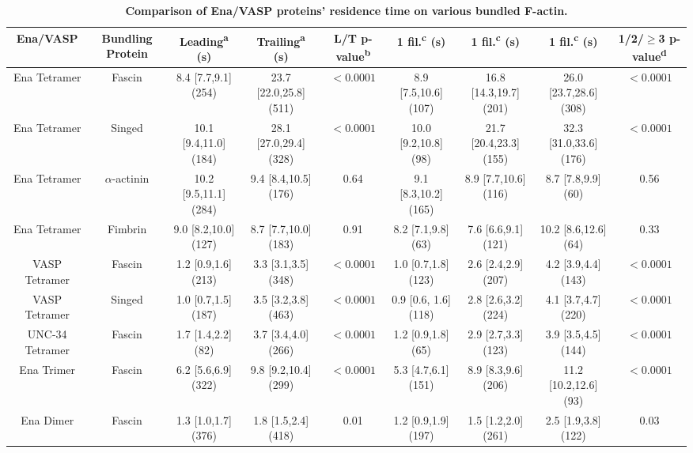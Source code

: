 \begin{table}[hbtp]
\footnotesize
\centering 
\begin{tabulary}{1.0\textwidth}{C C C C C C C C C}
\toprule Ena\slash VASP & Bundling Protein & Leading\textsuperscript{a} (s) & Trailing\textsuperscript{a} (s) & L/T p-value\textsuperscript{b} & 1 fil.\textsuperscript{c} (s) &  1 fil.\textsuperscript{c} (s) & 1 fil.\textsuperscript{c} (s) & 1/2/$\geq$3 p-value\textsuperscript{d} \\ \midrule 
Ena Tetramer & Fascin & 8.4 [7.7,9.1] (254) & 23.7 [22.0,25.8] (511) & ${<0.0001}$ & 8.9 [7.5,10.6] (107) & 16.8 [14.3,19.7] (201) & 26.0 [23.7,28.6] (308) & ${<0.0001}$ \\ 
Ena Tetramer & Singed & 10.1 [9.4,11.0] (184) & 28.1 [27.0,29.4] (328) & ${<0.0001}$ & 10.0 [9.2,10.8] (98) & 21.7 [20.4,23.3] (155) & 32.3 [31.0,33.6] (176) & ${<0.0001}$ \\ 
Ena Tetramer & $\alpha$-actinin & 10.2 [9.5,11.1] (284) & 9.4 [8.4,10.5] (176) & 0.64 & 9.1 [8.3,10.2] (165) & 8.9 [7.7,10.6] (116) & 8.7 [7.8,9.9] (60) & 0.56 \\
Ena Tetramer & Fimbrin & 9.0 [8.2,10.0] (127) & 8.7 [7.7,10.0] (183) & 0.91 & 8.2 [7.1,9.8] (63) & 7.6 [6.6,9.1] (121) & 10.2 [8.6,12.6] (64) & 0.33 \\
VASP Tetramer & Fascin & 1.2 [0.9,1.6] (213) & 3.3 [3.1,3.5] (348) & ${<0.0001}$ & 1.0 [0.7,1.8] (123) & 2.6 [2.4,2.9] (207) & 4.2 [3.9,4.4] (143) & ${<0.0001}$ \\
VASP Tetramer & Singed & 1.0 [0.7,1.5] (187) & 3.5 [3.2,3.8] (463) & ${<0.0001}$ & 0.9  [0.6, 1.6] (118) & 2.8 [2.6,3.2] (224) & 4.1 [3.7,4.7] (220) & ${<0.0001}$ \\
UNC-34 Tetramer & Fascin & 1.7 [1.4,2.2] (82) & 3.7 [3.4,4.0] (266) & ${<0.0001}$ & 1.2 [0.9,1.8] (65) & 2.9 [2.7,3.3] (123) & 3.9 [3.5,4.5] (144) & ${<0.0001}$ \\
Ena Trimer & Fascin & 6.2 [5.6,6.9] (322) & 9.8 [9.2,10.4] (299) & ${<0.0001}$ & 5.3 [4.7,6.1] (151) & 8.9 [8.3,9.6] (206) & 11.2 [10.2,12.6] (93) & ${<0.0001}$ \\
Ena Dimer & Fascin & 1.3 [1.0,1.7] (376) & 1.8 [1.5,2.4] (418) & 0.01 & 1.2 [0.9,1.9] (197) & 1.5 [1.2,2.0] (261) & 2.5 [1.9,3.8] (122) & 0.03 \\
\bottomrule
\end{tabulary}
\caption[Comparison of Ena/VASP proteins' residence time on various bundled F-actin.]{\textbf{Comparison of Ena/VASP proteins' residence time on various bundled F-actin.} \\
}
\end{table}
